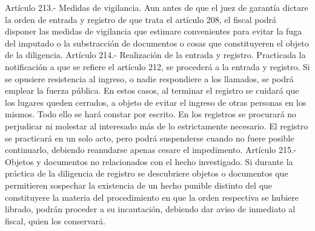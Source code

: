    Artículo 213.- Medidas de vigilancia. Aun antes de que el juez de garantía dictare la orden de entrada y registro de que trata el artículo 208, el fiscal podrá disponer las medidas de vigilancia que estimare convenientes para evitar la fuga del imputado o la substracción de documentos o cosas que constituyeren el objeto de la diligencia.
    Artículo 214.- Realización de la entrada y registro. Practicada la notificación a que se refiere el artículo 212, se procederá a la entrada y registro. Si se opusiere resistencia al ingreso, o nadie respondiere a los llamados, se podrá emplear la fuerza pública. En estos casos, al terminar el registro se cuidará que los lugares queden cerrados, a objeto de evitar el ingreso de otras personas en los mismos. Todo ello se hará constar por escrito.
    En los registros se procurará no perjudicar ni molestar al interesado más de lo estrictamente necesario.
    El registro se practicará en un solo acto, pero podrá suspenderse cuando no fuere posible continuarlo, debiendo reanudarse apenas cesare el impedimento.
    Artículo 215.- Objetos y documentos no relacionados con el hecho investigado. Si durante la práctica de la diligencia de registro se descubriere objetos o documentos que permitieren sospechar la existencia de un hecho punible distinto del que constituyere la materia del procedimiento en que la orden respectiva se hubiere librado, podrán proceder a su incautación, debiendo dar aviso de inmediato al fiscal, quien los conservará.

